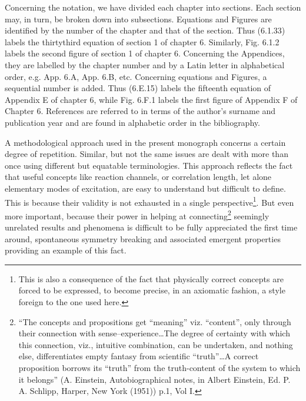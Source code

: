 Concerning the notation, we have divided each chapter into sections. Each section may, in turn, be broken down into subsections. Equations and Figures are identified by the number of the chapter and that of the section. Thus (6.1.33) labels the thirtythird equation of section 1 of chapter 6. Similarly, Fig. 6.1.2 labels the second figure of section 1 of chapter 6. Concerning the Appendices, they are labelled by the chapter number and by a Latin letter in alphabetical order, e.g. App. 6.A, App. 6.B, etc. Concerning equations and Figures, a sequential number is added. Thus (6.E.15) labels the fifteenth equation of Appendix E of chapter 6, while Fig. 6.F.1 labels the first figure of Appendix F of Chapter 6. References are referred to in terms of the author's surname and publication year and are found in alphabetic order in the bibliography.

A methodological approach used in the present monograph concerns a certain degree of repetition. Similar, but not the same issues are dealt with more than once using different but equatable terminologies. This approach reflects the fact that useful concepts like reaction channels, or correlation length, let alone elementary modes of excitation, are easy to understand but difficult to define. This is because their validity is not exhausted in a single perspective\footnote{This is also a consequence of the fact that physically correct concepts are forced to be expressed, to become precise, in an axiomatic fashion, a style foreign to the one used here.}. But even more important, because their power in helping at connecting\footnote{``The concepts and propositions get ``meaning'' viz. ``content'', only through their connection with sense--experience\dots The degree of certainty with which this connection, viz., intuitive combination, can be undertaken, and nothing else, differentiates empty fantasy from scientific ``truth''\dots A correct proposition borrows its ``truth'' from the truth-content of the system to which it belongs'' (A. Einstein, Autobiographical notes, in Albert Einstein, Ed. P. A. Schlipp, Harper, New York (1951)) p.1, Vol I.} seemingly unrelated results and phenomena is difficult to be fully appreciated the first time around, spontaneous symmetry breaking and associated emergent properties providing an example of this fact.


